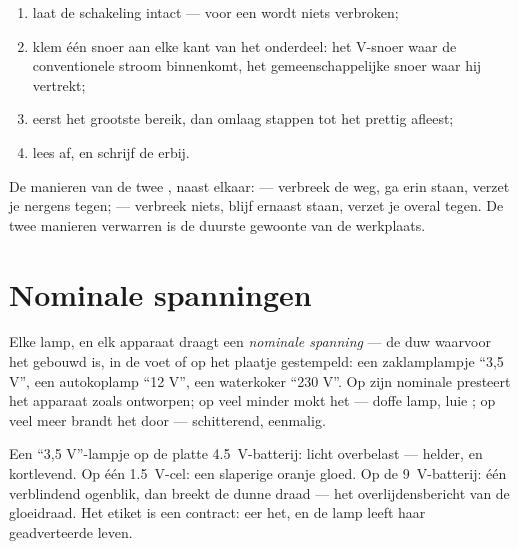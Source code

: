 \begin{method}\label{met:g8:voltage-voltmeter:measure}
\begin{enumerate}
  \item laat de schakeling intact --- voor een  wordt
        niets verbroken;
  \item klem één snoer aan elke kant van het onderdeel: het
        \unit{V}-snoer waar de conventionele stroom binnenkomt, het
        gemeenschappelijke snoer waar hij vertrekt;
  \item eerst het grootste bereik, dan omlaag stappen tot het prettig
        afleest;
  \item lees af, en schrijf de  erbij.
\end{enumerate}
De manieren van de twee , naast elkaar:
 --- verbreek de weg, ga erin staan, verzet je
nergens tegen;  --- verbreek niets, blijf ernaast staan,
verzet je overal tegen. De twee manieren verwarren is de duurste
gewoonte van de werkplaats.
\end{method}

\section{Nominale spanningen}

\begin{definition}\label{def:g8:voltage-voltmeter:nominal}
Elke lamp,  en elk apparaat draagt een \emph{nominale
spanning} --- de duw waarvoor het gebouwd is,
in de voet of op het plaatje gestempeld: een zaklamplampje
``3,5 V'', een autokoplamp ``12 V'', een waterkoker ``230 V''. Op zijn
nominale  presteert het apparaat zoals ontworpen; op veel
minder mokt het --- doffe lamp, luie ; op veel meer brandt
het door --- schitterend, eenmalig.
\end{definition}

\begin{example}\label{ex:g8:voltage-voltmeter:matching}
Een ``3,5 V''-lampje op de platte \qty{4.5}{V}-batterij: licht
overbelast --- helder, en kortlevend. Op één \qty{1.5}{V}-cel: een
slaperige oranje gloed. Op de \qty{9}{V}-batterij: één
verblindend ogenblik, dan breekt de dunne draad --- het overlijdensbericht
van de gloeidraad. Het etiket is een contract: eer het, en de lamp
leeft haar geadverteerde leven.
\end{example}

